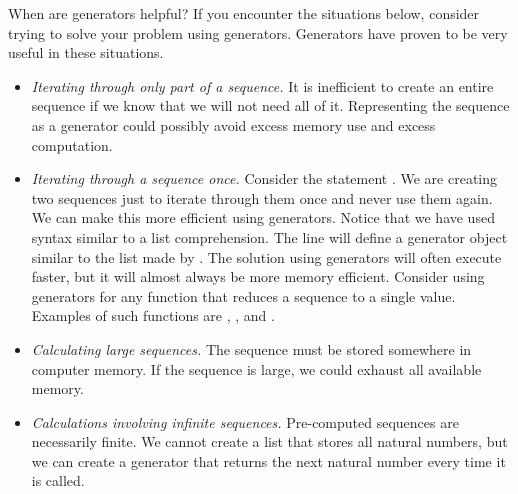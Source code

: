 When are generators helpful? 
If you encounter the situations below, consider trying to solve 
your problem using generators.
Generators have proven to be very useful in these situations.
\begin{itemize}
\item \emph{Iterating through only part of a sequence.}
It is inefficient to create an entire sequence if we know that we will not need all of it.
Representing the sequence as a generator could possibly avoid excess memory use and excess computation.
\item \emph{Iterating through a sequence once.} Consider the statement 
.
We are creating two sequences just to iterate through them once and never use them again.
We can make this more efficient using generators.
Notice that we have used syntax similar to a list comprehension.
The line  will define a generator object similar to the list made by \li{[i for i in xrange(1000) if i\%2 == 0]}.
The solution using generators will often execute faster, but it will almost always be more memory efficient.  Consider using generators for any function that reduces a sequence to a single value.  Examples of such functions are , , and .
\item \emph{Calculating large sequences.}  The sequence must be stored somewhere in computer memory.
If the sequence is large, we could exhaust all available memory.
\item \emph{Calculations involving infinite sequences.}  Pre-computed sequences are necessarily finite.  We cannot create a list that stores all natural numbers, but we can create a generator that returns the next natural number every time it is called.
\end{itemize}

